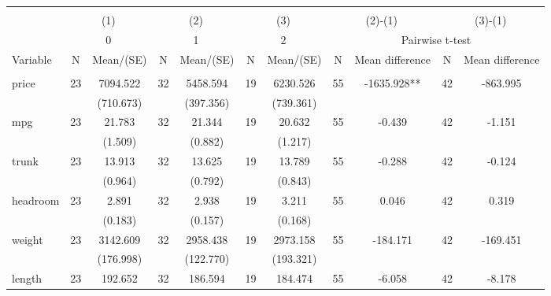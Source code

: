 
\begin{tabular}{@{\extracolsep{5pt}}lcccccccccc}
\\[-1.8ex]\hline \hline \\[-1.8ex]
 & \multicolumn{2}{c}{(1)}  & \multicolumn{2}{c}{(2)}  & \multicolumn{2}{c}{(3)}  & \multicolumn{2}{c}{(2)-(1)} & \multicolumn{2}{c}{(3)-(1)} \\
 & \multicolumn{2}{c}{0}  & \multicolumn{2}{c}{1}  & \multicolumn{2}{c}{2}  & \multicolumn{4}{c}{Pairwise t-test}  \\
Variable & N & Mean/(SE) & N & Mean/(SE) & N & Mean/(SE) & N & Mean difference & N & Mean difference \\ \hline \\[-1.8ex] 
price   & 23    & 7094.522    & 32    & 5458.594    & 19    & 6230.526    & 55    & -1635.928**    & 42    & -863.995   \\
 &   & (710.673)  &   & (397.356)  &   & (739.361)  &   &  &   &  \\ [1ex]
mpg   & 23    & 21.783    & 32    & 21.344    & 19    & 20.632    & 55    & -0.439    & 42    & -1.151   \\
 &   & (1.509)  &   & (0.882)  &   & (1.217)  &   &  &   &  \\ [1ex]
trunk   & 23    & 13.913    & 32    & 13.625    & 19    & 13.789    & 55    & -0.288    & 42    & -0.124   \\
 &   & (0.964)  &   & (0.792)  &   & (0.843)  &   &  &   &  \\ [1ex]
headroom   & 23    & 2.891    & 32    & 2.938    & 19    & 3.211    & 55    & 0.046    & 42    & 0.319   \\
 &   & (0.183)  &   & (0.157)  &   & (0.168)  &   &  &   &  \\ [1ex]
weight   & 23    & 3142.609    & 32    & 2958.438    & 19    & 2973.158    & 55    & -184.171    & 42    & -169.451   \\
 &   & (176.998)  &   & (122.770)  &   & (193.321)  &   &  &   &  \\ [1ex]
length   & 23    & 192.652    & 32    & 186.594    & 19    & 184.474    & 55    & -6.058    & 42    & -8.178   \\

\end{tabular}
